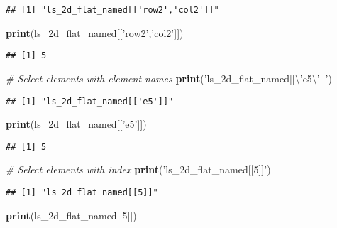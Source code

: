 \documentclass[
]{book}
\newenvironment{Shaded}{\begin{snugshade}}{\end{snugshade}}
\newcommand{\CharTok}[1]{\textcolor[rgb]{0.31,0.60,0.02}{#1}}
\newcommand{\CommentTok}[1]{\textcolor[rgb]{0.56,0.35,0.01}{\textit{#1}}}
\newcommand{\DecValTok}[1]{\textcolor[rgb]{0.00,0.00,0.81}{#1}}
\newcommand{\KeywordTok}[1]{\textcolor[rgb]{0.13,0.29,0.53}{\textbf{#1}}}
\newcommand{\NormalTok}[1]{#1}
\newcommand{\StringTok}[1]{\textcolor[rgb]{0.31,0.60,0.02}{#1}}
\begin{document}
\begin{verbatim}
## [1] "ls_2d_flat_named[['row2','col2']]"
\end{verbatim}

\begin{Shaded}
\begin{Highlighting}[]
\KeywordTok{print}\NormalTok{(ls_2d_flat_named[[}\StringTok{'row2'}\NormalTok{,}\StringTok{'col2'}\NormalTok{]])}
\end{Highlighting}
\end{Shaded}

\begin{verbatim}
## [1] 5
\end{verbatim}

\begin{Shaded}
\begin{Highlighting}[]
\CommentTok{# Select elements with element names}
\KeywordTok{print}\NormalTok{(}\StringTok{'ls_2d_flat_named[[}\CharTok{\textbackslash{}'}\StringTok{e5}\CharTok{\textbackslash{}'}\StringTok{]]'}\NormalTok{)}
\end{Highlighting}
\end{Shaded}

\begin{verbatim}
## [1] "ls_2d_flat_named[['e5']]"
\end{verbatim}

\begin{Shaded}
\begin{Highlighting}[]
\KeywordTok{print}\NormalTok{(ls_2d_flat_named[[}\StringTok{'e5'}\NormalTok{]])}
\end{Highlighting}
\end{Shaded}

\begin{verbatim}
## [1] 5
\end{verbatim}

\begin{Shaded}
\begin{Highlighting}[]
\CommentTok{# Select elements with index}
\KeywordTok{print}\NormalTok{(}\StringTok{'ls_2d_flat_named[[5]]'}\NormalTok{)}
\end{Highlighting}
\end{Shaded}

\begin{verbatim}
## [1] "ls_2d_flat_named[[5]]"
\end{verbatim}

\begin{Shaded}
\begin{Highlighting}[]
\KeywordTok{print}\NormalTok{(ls_2d_flat_named[[}\DecValTok{5}\NormalTok{]])}
\end{Highlighting}
\end{Shaded}
\end{document}
